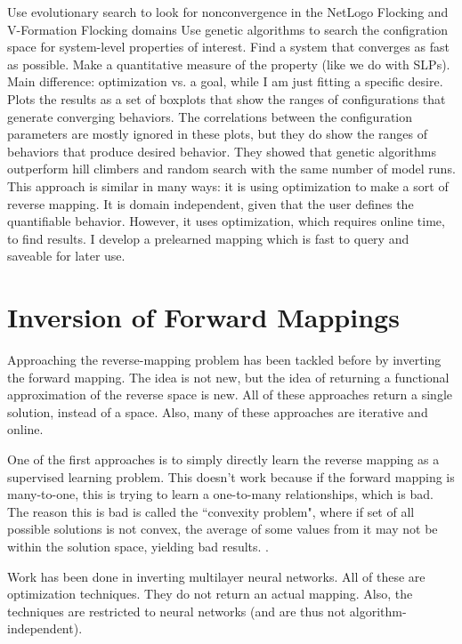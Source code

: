 Use evolutionary search to look for nonconvergence in the NetLogo Flocking and V-Formation Flocking domains \cite{stonedahl}
Use genetic algorithms to search the configration space for system-level properties of interest.
Find a system that converges as fast as possible.
Make a quantitative measure of the property (like we do with SLPs).
Main difference: optimization vs. a goal, while I am just fitting a specific desire.
Plots the results as a set of boxplots that show the ranges of configurations that generate converging behaviors.
The correlations between the configuration parameters are mostly ignored in these plots, but they do show the ranges of behaviors that produce desired behavior.
They showed that genetic algorithms outperform hill climbers and random search with the same number of model runs.
This approach is similar in many ways: it is using optimization to make a sort of reverse mapping.
It is domain independent, given that the user defines the quantifiable behavior.
However, it uses optimization, which requires online time, to find results.
I develop a prelearned mapping which is fast to query and saveable for later use.



\section{Inversion of Forward Mappings}
Approaching the reverse-mapping problem has been tackled before by inverting the forward mapping.
The idea is not new, but the idea of returning a functional approximation of the reverse space is new.
All of these approaches return a single solution, instead of a space.
Also, many of these approaches are iterative and online.

One of the first approaches is to simply directly learn the reverse mapping as a supervised learning problem\cite{widrow1985adaptive}.
This doesn't work because if the forward mapping is many-to-one, this is trying to learn a one-to-many relationships, which is bad.
The reason this is bad is called the ``convexity problem", where if set of all possible solutions is not convex, the average of some values from it may not be within the solution space, yielding bad results. \cite{jordan-forward}.

Work has been done in inverting multilayer neural networks.
All of these are optimization techniques.
They do not return an actual mapping.
Also, the techniques are restricted to neural networks (and are thus not algorithm-independent).

